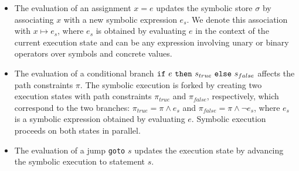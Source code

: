 \begin{itemize}
  \item The evaluation of an assignment $x=e$ updates the symbolic store $\sigma$ by associating $x$ with a new symbolic expression $e_s$. We denote this association with $x\mapsto e_s$, where $e_s$ is obtained by evaluating $e$ in the context of the current execution state and  can be any expression involving unary or binary operators over symbols and concrete values.
  

  \item The evaluation of a conditional branch ${\tt if}~e~{\tt then}~s_{true}~{\tt else}~s_{false}$ affects the path constraints $\pi$. The symbolic execution is forked by creating two execution states with path constraints $\pi_{true}$ and $\pi_{false}$, respectively, which correspond to the two branches: $\pi_{true}=\pi \wedge e_s$ and $\pi_{false}=\pi \wedge \neg e_s$, where $e_s$ is a symbolic expression obtained by evaluating $e$. 
    Symbolic execution proceeds on both states in parallel.

  \item The evaluation of a jump {\tt goto} $s$ updates the execution state by advancing the symbolic execution to statement $s$. 
\end{itemize}



